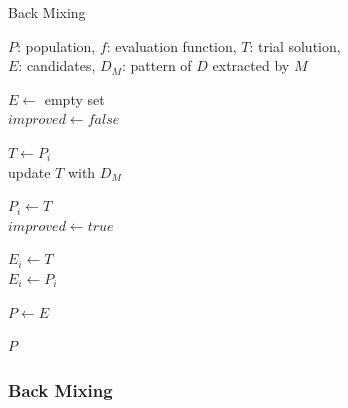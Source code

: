 \documentclass{sig-alternate-05-2015}
\begin{document}
\begin{algorithm}[t!]
\caption{Back Mixing}\label{algo_disjdecomp}

$P$: population, $f$: evaluation function, $T$: trial solution, \\
$E$: candidates, ${D_M}$: pattern of $D$ extracted by $M$ \\

\BlankLine
{}


\BlankLine
$E \leftarrow$ empty set \\
$improved  \leftarrow false$ \\

\BlankLine
{} {

    $T \leftarrow P_i$ \\
    update $T$ with ${D_M}$ \\

     {

        $P_i \leftarrow T$ \\
        $improved  \leftarrow true$ \\
    }{
         {
            $E_i \leftarrow T$ \\
        }{
			  $E_i \leftarrow P_i$ \\
        }
    }
}
 {
    $P \leftarrow E$ \\
} 

\Return $P$

\end{algorithm} 

\subsubsection{Back Mixing}
\end{document}
